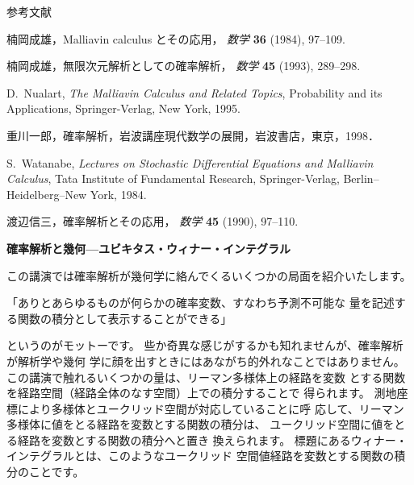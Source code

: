 \documentclass[uplatex,dvipdfmx]{jlreq}
\begin{document}
\begin{center}\textsc{参考文献}\end{center}

\begin{enumerate}[{[1]}]
  \setlength{\itemsep}{2pt}
  \item[{[1]}] 楠岡成雄，Malliavin calculus とその応用，
        \textit{数学} \textbf{36} (1984), 97--109.
  \item[{[2]}] 楠岡成雄，無限次元解析としての確率解析，
        \textit{数学} \textbf{45} (1993), 289--298.
  \item[{[3]}] D.~Nualart,
        \textit{The Malliavin Calculus and Related Topics},
        Probability and its Applications, Springer-Verlag, New York, 1995.
  \item[{[4]}] 重川一郎，確率解析，岩波講座現代数学の展開，岩波書店，東京，1998．
  \item[{[5]}] S.~Watanabe,
        \textit{Lectures on Stochastic Differential Equations and Malliavin Calculus},
        Tata Institute of Fundamental Research, Springer-Verlag, Berlin--Heidelberg--New York, 1984.
  \item[{[6]}] 渡辺信三，確率解析とその応用，
        \textit{数学} \textbf{45} (1990), 97--110.
\end{enumerate}

\newpage

\begin{center}
{\Large\bfseries 確率解析と幾何---ユビキタス・ウィナー・インテグラル}

\hspace*{\fill}{\large\bfseries 谷口 説男（九州大学大学院数理学研究院）}
\end{center}

\bigskip

この講演では確率解析が幾何学に絡んでくるいくつかの局面を紹介いたします。

\begin{center}
\vfill
\begin{minipage}{11cm}
「ありとあらゆるものが何らかの確率変数、すなわち予測不可能な
量を記述する関数の積分として表示することができる」
\end{minipage}
\end{center}
\vfill
というのがモットーです。
些か奇異な感じがするかも知れませんが、確率解析が解析学や幾何
学に顔を出すときにはあながち的外れなことではありません。
この講演で触れるいくつかの量は、リーマン多様体上の経路を変数
とする関数を経路空間（経路全体のなす空間）上での積分することで
得られます。
測地座標により多様体とユークリッド空間が対応していることに呼
応して、リーマン多様体に値をとる経路を変数とする関数の積分は、
ユークリッド空間に値をとる経路を変数とする関数の積分へと置き
換えられます。
標題にあるウィナー・インテグラルとは、このようなユークリッド
空間値経路を変数とする関数の積分のことです。
\end{document}
